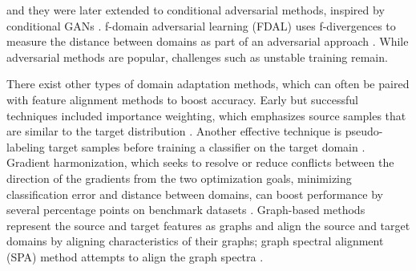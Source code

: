 and they were later extended to conditional adversarial methods, inspired by conditional GANs \citep{long_conditional_2018}.
f-domain adversarial learning (FDAL) uses f-divergences to measure the distance between domains as part of an adversarial approach \cite{acuna2021f}.
While adversarial methods are popular, challenges such as unstable training remain.

There exist other types of domain adaptation methods, which can often be paired with feature alignment methods to boost accuracy.
Early but successful techniques included importance weighting, which emphasizes source samples that are similar to the target distribution \citep{pmlr-v28-gong13, Long_2014_CVPR}. %
Another effective technique is pseudo-labeling target samples before training a classifier on the target domain \citep{sohn2020fixmatch}.
Gradient harmonization, which seeks to resolve or reduce conflicts between the direction of the gradients from the two optimization goals, minimizing classification error and distance between domains, can boost performance by several percentage points on benchmark datasets \citep{huang_gradient_2024}.
Graph-based methods represent the source and target features as graphs and align the source and target domains by aligning characteristics of their graphs; graph spectral alignment (SPA) method attempts to align the graph spectra \citep{xiao2024spa}.

